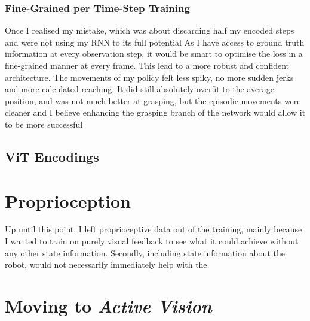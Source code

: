 

\subsubsection{Fine-Grained per Time-Step Training}
Once I realised my mistake, which was about discarding half my encoded steps and were not using my RNN to its full potential  As I have access to ground truth information at every observation step, it would be smart to optimise the loss in a fine-grained manner at every frame.
This lead to a more robust and confident architecture. The movements of my policy felt less spiky, no more sudden jerks and more calculated reaching. It did still absolutely overfit to the average position, and was not much better at grasping, but the episodic movements were cleaner and I believe enhancing the grasping branch of the network would allow it to be more successful 


\subsection{ViT Encodings}

\section{Proprioception}
Up until this point, I left proprioceptive data out of the training, mainly because I wanted to train on purely visual feedback to see what it could achieve without any other state information. Secondly, including state information about the robot, would not necessarily immediately help with the 

\section{Moving to \emph{Active Vision}}




